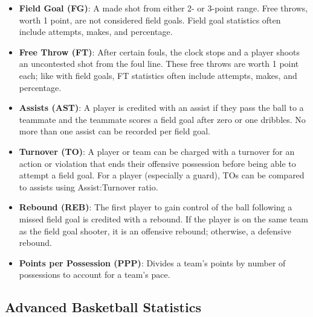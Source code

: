 \documentclass[
  11pt,
]{book}
\theoremstyle{definition}
\theoremstyle{definition}
\theoremstyle{definition}
\theoremstyle{definition}
\theoremstyle{remark}
\begin{document}
\begin{itemize}
\item
  \textbf{Field Goal (FG)}: A made shot from either 2- or 3-point range. Free throws, worth 1 point, are not considered field goals. Field goal statistics often include attempts, makes, and percentage.
\item
  \textbf{Free Throw (FT)}: After certain fouls, the clock stops and a player shoots an uncontested shot from the foul line. These free throws are worth 1 point each; like with field goals, FT statistics often include attempts, makes, and percentage.
\item
  \textbf{Assists (AST)}: A player is credited with an assist if they pass the ball to a teammate and the teammate scores a field goal after zero or one dribbles. No more than one assist can be recorded per field goal.
\item
  \textbf{Turnover (TO)}: A player or team can be charged with a turnover for an action or violation that ends their offensive possession before being able to attempt a field goal. For a player (especially a guard), TOs can be compared to assists using Assist:Turnover ratio.
\item
  \textbf{Rebound (REB)}: The first player to gain control of the ball following a missed field goal is credited with a rebound. If the player is on the same team as the field goal shooter, it is an offensive rebound; otherwise, a defensive rebound.
\item
  \textbf{Points per Possession (PPP)}: Divides a team's points by number of possessions to account for a team's pace.
\end{itemize}

\hypertarget{advanced-basketball-statistics}{%
\subsection{Advanced Basketball Statistics}\label{advanced-basketball-statistics}}
\end{document}
